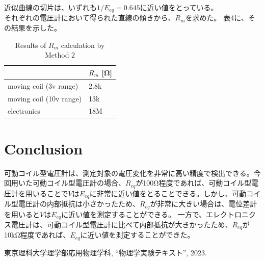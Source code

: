 \documentclass[a4paper,10pt]{jsarticle}
\begin{document}
近似曲線の切片は、いずれも$1/E_{eq} = 0.645$に近い値をとっている。\\
それぞれの電圧計において得られた直線の傾きから、$R_m$を求めた。
表4に、その結果を示した。
\begin{table}[H]
  \centering
  \caption{Results of $R_m$ calculation by Method 2}
    \begin{tabular}{ll}
          & $R_m$ [Ω] \\
    \midrule
    \midrule
    moving coil (3v range) & 2.8k \\
    moving coil (10v range) & 13k \\
    electronics &  18M \\
    \end{tabular}%
  \label{tab:addlabel}%
\end{table}%

\section{Conclusion}

可動コイル型電圧計は、測定対象の電圧変化を非常に高い精度で検出できる。今回用いた可動コイル型電圧計の場合、$R_{eq}$が100Ω程度であれば、可動コイル型電圧計を用いることで$V$は$E_{eq}$に非常に近い値をとることできる。しかし、可動コイル型電圧計の内部抵抗は小さかったため、$R_{eq}$が非常に大きい場合は、電位差計を用いると$V$は$E_{eq}$に近い値を測定することができる。
一方で、エレクトロニクス電圧計は、可動コイル型電圧計に比べて内部抵抗が大きかったため、$R_{eq}$が10kΩ程度であれば、$E_{eq}$に近い値を測定することができた。

\begin{thebibliography}{文献数}
 東京理科大学理学部応用物理学科, ``物理学実験テキスト'', 2023.
\end{thebibliography}
\clearpage
\end{document}
